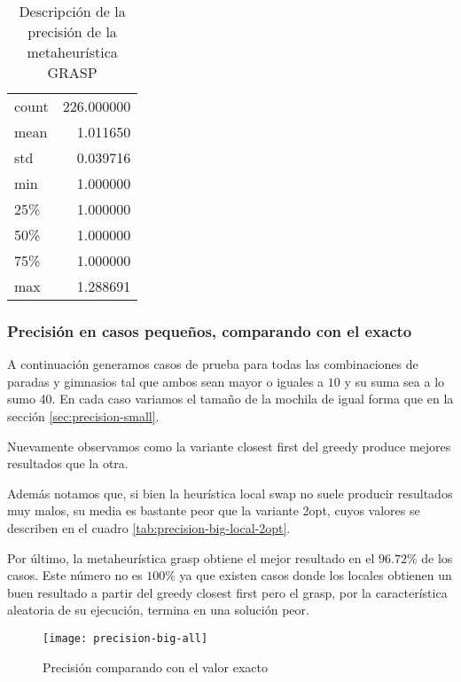 \begin{table}[H]
    \begin{center}
        \begin{tabular}{| l r |}
            \hline
            count  & 226.000000 \\
            mean   &   1.011650 \\
            std    &   0.039716 \\
            min    &   1.000000 \\
            25\%   &   1.000000 \\
            50\%   &   1.000000 \\
            75\%   &   1.000000 \\
            max    &   1.288691 \\
            \hline
        \end{tabular}
        \caption{Descripción de la precisión de la metaheurística GRASP}\label{tab:precision-small-grasp}
    \end{center}
\end{table}

\subsubsection{Precisión en casos pequeños, comparando con el exacto}

A continuación generamos casos de prueba para todas las combinaciones de paradas y gimnasios tal que ambos
sean mayor o iguales a $10$ y su suma sea a lo sumo 40.
En cada caso variamos el tamaño de la mochila de igual forma que en la sección \ref{sec:precision-small}.

Nuevamente observamos como la variante closest first del greedy produce mejores resultados que la otra.

Además notamos que, si bien la heurística local swap no suele producir resultados muy malos,
su media es bastante peor que la variante 2opt, cuyos valores se describen en el cuadro \ref{tab:precision-big-local-2opt}.

Por último, la metaheurística grasp obtiene el mejor resultado en el $96.72\%$ de los casos.
Este número no es $100\%$ ya que existen casos donde los locales obtienen un buen resultado a partir del greedy closest first
pero el grasp, por la característica aleatoria de su ejecución, termina en una solución peor.

\begin{figure}[H]
    \centering
    \texttt{[image: precision-big-all]}
    \caption{Precisión comparando con el valor exacto}
    \label{fig:precision-big-all}
\end{figure}

